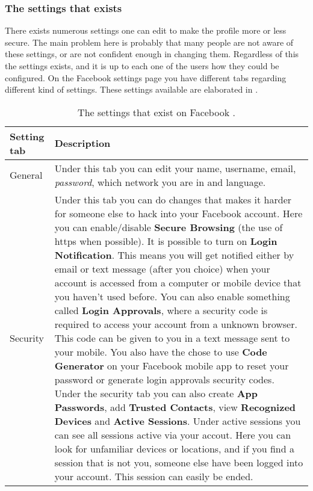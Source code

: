 \subsubsection{The settings that exists}
There exists numerous settings one can edit to make the profile more or less secure. The main problem here is probably that many people are not aware of these settings, or are not confident enough in changing them. Regardless of this the settings exists, and it is up to each one of the users how they could be configured. 
On the Facebook settings page you have different tabs regarding different kind of settings. These settings available are elaborated in .

\newpage

\begin{center}
    \begin{longtable}{ | l | p{9cm} |}
    \caption{\label{tab:settings}The settings that exist on Facebook 				\cite{facebooksettings}.} \\
    \hline
    \textbf{Setting tab} & \textbf{Description} \\ 
    \hline
    General & Under this tab you can edit your name, username, email, \textit{password}, which network you are in and language. \\
    \hline
    Security & Under this tab you can do changes that makes it harder for someone else to hack into your Facebook account. Here you can enable/disable \textbf{Secure Browsing} (the use of https when possible). It is possible to turn on \textbf{Login Notification}. This means you will get notified either by email or text message (after you choice) when your account is accessed from a computer or mobile device that you haven't used before. You can also enable something called \textbf{Login Approvals}, where a security code is required to access your account from a unknown browser. This code can be given to you in a text message sent to your mobile. You also have the chose to use \textbf{Code Generator} on your Facebook mobile app to reset your password or generate login approvals security codes. Under the security tab you can also create \textbf{App Passwords}, add \textbf{Trusted Contacts}, view \textbf{Recognized Devices} and \textbf{Active Sessions}. Under active sessions you can see all sessions active via your accout. Here you can look for unfamiliar devices or locations, and if you find a session that is not you, someone else have been logged into your account. This session can easily be ended. \\ 

\end{longtable}
\end{center}
